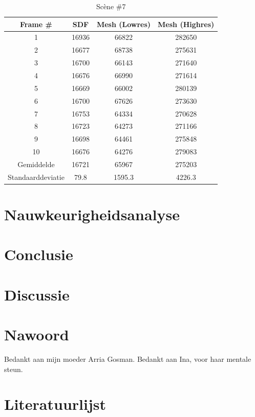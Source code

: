 \documentclass[12pt, a4paper]{article}
\begin{document}
\begin{table}[H]
\centering
\begin{tabular}{| c | c c c |}
	\hline
	Frame \# & SDF & Mesh (Lowres) & Mesh (Highres) \\
	\hline
	1 &16936 &66822 &282650 \\
	2 &16677 &68738 &275631 \\
	3 &16700 &66143 &271640 \\
	4 &16676 &66990 &271614 \\
	5 &16669 &66002 &280139 \\
	6 &16700 &67626 &273630 \\
	7 &16753 &64334 &270628 \\
	8 &16723 &64273 &271166 \\
	9 &16698 &64461 &275848 \\
	10 &16676 &64276 &279083 \\
	\hline
	Gemiddelde &16721 &65967 &275203 \\
	Standaarddeviatie &79.8 &1595.3 &4226.3 \\
	\hline
\end{tabular}
\caption{Scène \#7}
\end{table}
\clearpage
\section{Nauwkeurigheidsanalyse}
\clearpage
\section{Conclusie}
\clearpage
\section{Discussie}
\clearpage
\section{Nawoord}
Bedankt aan mijn moeder Arria Gosman.
Bedankt aan Ina, voor haar mentale steun.
\clearpage
\section{Literatuurlijst}


\clearpage
\end{document}
